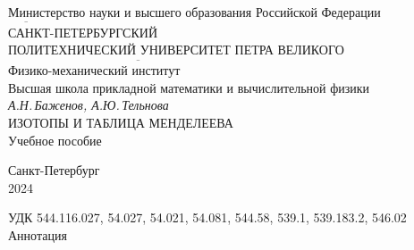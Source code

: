 \documentclass[a5paper,openany]{book}
\newcommand{\ov}{\overline}
\begin{document}
\begin{center}
	\hfill \break
	Министерство науки и высшего образования  Российской Федерации\\
	$\ov{~~~~~~~~~~~~~}$\\
	\normalsize{	САНКТ-ПЕТЕРБУРГСКИЙ \\
		ПОЛИТЕХНИЧЕСКИЙ УНИВЕРСИТЕТ ПЕТРА ВЕЛИКОГО}\\ 
	$\ov{~~~~~~~~~~~~~~~~~~~~~~~~~~~~~~~~~~~~~~~~~~~~~~~~~~~~~~~~~~~~~~~~~~~~~~~~~~~~~~~~~~~~~~~~~~~~~~}$\\	
	{Физико-механический институт}\\
	{\small Высшая школа прикладной математики и вычислительной физики}\\
	\hfill \break 		\hfill \break		\hfill \break	
	\Large{\it А.Н.\,Баженов, А.Ю.\,Тельнова\\
		\hfill \break		\hfill \break			\hfill \break		\hfill \break		}
	{\Large	ИЗОТОПЫ И ТАБЛИЦА МЕНДЕЛЕЕВА\\}
	\hfill \break 	\hfill \break	
	\Large{	Учебное пособие	
	}\\
\end{center}
		\hfill \break		\hfill \break	
\begin{center}\Large{Санкт-Петербург \\
		2024} \end{center}
\thispagestyle{empty} %
	\newpage
	УДК 544.116.027,  54.027, 54.021, 54.081, 544.58, 539.1, 539.183.2, 546.02%
	\\
	
	Аннотация \\
	
\end{document}
